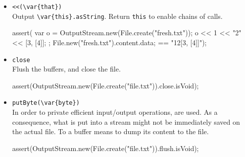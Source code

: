 \begin{itemize}
\item \lstinline|<<(\var{that})|\\
  Output \lstinline|\var{this}.asString|.  Return \lstinline|this| to
  enable chains of calls.
\begin{urbiscript}[firstnumber=last]
assert(
  {
    {
      var o = OutputStream.new(File.create("fresh.txt"));
      o << 1 << "2" << [3, [4]];
    };
    File.new("fresh.txt").content.data;
  }
  ==
  "12[3, [4]]");
\end{urbiscript}

\item \lstinline|close|\\
  Flush the buffers, and close the file.
\begin{urbiscript}[firstnumber=last]
assert(OutputStream.new(File.create("file.txt")).close.isVoid);
\end{urbiscript}

\item \lstinline|putByte(\var{byte})|\\
  In order to private efficient input/output operations,
   are used.  As a consequence, what is put into
  a stream might not be immediately saved on the actual file.  To
   a buffer means to dump its content to the file.
\begin{urbiscript}[firstnumber=last]
assert(OutputStream.new(File.create("file.txt")).flush.isVoid);
\end{urbiscript}
\end{itemize}



